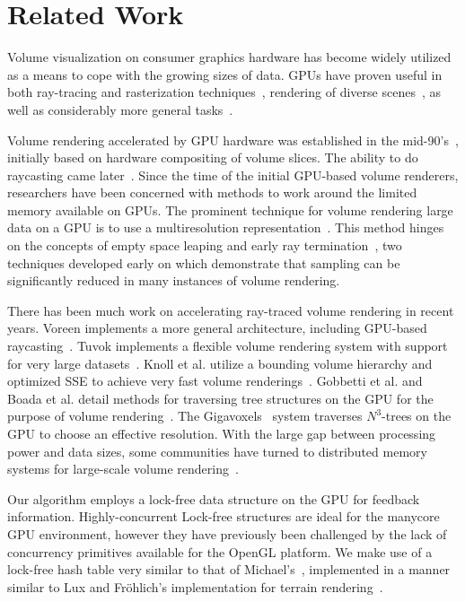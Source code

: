 \section{Related Work}

Volume visualization on consumer graphics hardware has become widely
utilized as a means to cope with the growing sizes of data.  GPUs have
proven useful in both ray-tracing and rasterization
techniques~\cite{Reichl:2012:HybridSurface, Dick:2009:Terrain},
rendering of diverse scenes~\cite{Parker:2010:Optix}, as well
as considerably more general tasks~\cite{Owens:2007:GPGPU}.

Volume rendering accelerated by GPU hardware was established in the
mid-90's~\cite{Cullip:1993:AVRW, Cabral:1994:AVRA}, initially based on
hardware compositing of volume slices.  The ability to do raycasting
came later~\cite{Krueger:2003:ATGV}.  Since the time of the initial
GPU-based volume renderers, researchers have been concerned with
methods to work around the limited memory available on GPUs.  The
prominent technique for volume rendering large data on a GPU is to use
a multiresolution
representation~\cite{Boada:2001:Multires, LaMar:2000:Multires,
Weiler:2000:LoD}.  This method hinges on the concepts of empty space
leaping and early ray termination~\cite{Levoy:EarlyTermination}, two
techniques developed early on which demonstrate that sampling can be
significantly reduced in many instances of volume rendering.

There has been much work on accelerating ray-traced volume rendering in
recent years.  Voreen implements a more general architecture,
including GPU-based raycasting~\cite{Voreen:2009}.  Tuvok implements a
flexible volume rendering system with support for very large
datasets~\cite{Fogal:2010:Tuvok, Fogal:2009:SizeMatters}.  Knoll et al.
utilize a bounding volume hierarchy and optimized SSE to achieve very
fast
volume renderings~\cite{Knoll:2010:BVH}.  Gobbetti et al. and Boada et
al. detail methods for traversing tree structures on the GPU for
the purpose of volume rendering~\cite{Gobbetti:2008:VR,
Boada:2001:Octree}.
The Gigavoxels~\cite{Crassin:2009:Gigavoxels} system traverses
$N^3$-trees on the GPU to choose an effective resolution.  With the
large gap between processing power and data sizes, some communities
have turned to distributed memory systems for large-scale
volume rendering~\cite{Childs:2006:ScalableVR, Howison:2010:MPIHybrid,
Fogal:2010:HPG, Beyer:2012:DSM}.

Our algorithm employs a lock-free data structure on the GPU for
feedback information.  Highly-concurrent Lock-free structures are ideal
for the manycore GPU environment, however they have previously been
challenged by the lack of concurrency primitives available for the
OpenGL platform.  We make use of a lock-free hash table very similar to
that of Michael's~\cite{Michael:2002:LockFreeHT}, implemented in a
manner similar to Lux and Fr\"ohlich's implementation for terrain
rendering~\cite{Lux:2011:RCHeight}.

